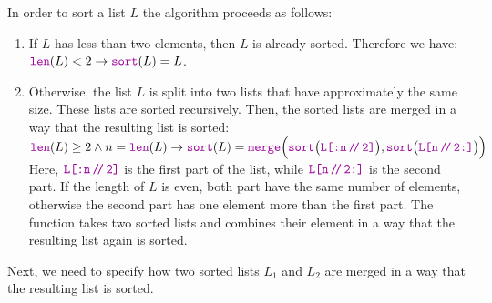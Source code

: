In order to sort a list $L$ the algorithm proceeds as follows:
\begin{enumerate}
\item If $L$ has less than two elements, then $L$ is already sorted.  Therefore we have: 
      \\[0.2cm]
      \hspace*{0.3cm}
      $\mytt{len}(L) < 2 \rightarrow \mytt{sort}(L) = L$.
\item Otherwise, the list $L$ is split into two lists that have approximately the same size.
      These lists are sorted recursively.  Then, the sorted lists are merged in a way that the
      resulting list is sorted: \\[0.2cm]
      \hspace*{0.3cm} 
      $\mytt{len}(L) \geq 2 \wedge n = \mytt{len}(L) \rightarrow \mytt{sort}(L) =
         \mytt{merge}\Bigl(\mytt{sort}\bigl(\mytt{L[:n\dv 2]}\bigr),
         \mytt{sort}\bigl(\mytt{L[n\dv 2:]}\bigr)\Bigr)
     $
      \\[0.2cm]
      Here,  $\mytt{L[:n\dv 2]}$ is the first part of the list, while
      $\mytt{L[n\dv 2:]}$ is the second part.  If the length of $L$ is even, both part have the same number of
      elements, otherwise the second part has one element more than the first part.  The function 
      takes two sorted lists and combines their element in a way that the resulting list again is sorted.
\end{enumerate}
Next, we need to specify how two sorted lists $L_1$ and $L_2$ are merged in a way that the resulting list
is sorted.
